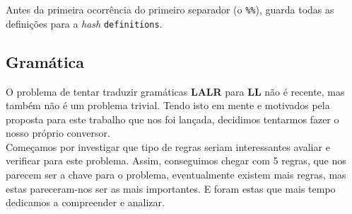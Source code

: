 \documentclass[11pt,a4paper]{article}
\begin{document}
Antes da primeira ocorrência do primeiro separador (o \texttt{\%\%}), guarda todas as definições para a \emph{hash} \texttt{definitions}. 

\subsection{Gramática}
O problema de tentar traduzir gramáticas \textbf{LALR} para \textbf{LL} não é recente, mas também não é um problema trivial. Tendo isto em mente e motivados pela proposta
para este trabalho que nos foi lançada, decidimos tentarmos fazer o nosso próprio conversor.\\
Começamos por investigar que tipo de regras seriam interessantes avaliar e verificar para este problema. Assim, conseguimos chegar com 5 regras, que nos parecem ser a chave
para o problema, eventualmente existem mais regras, mas estas pareceram-nos ser as mais importantes. E foram estas que mais tempo dedicamos a compreender e analizar.
\end{document}

